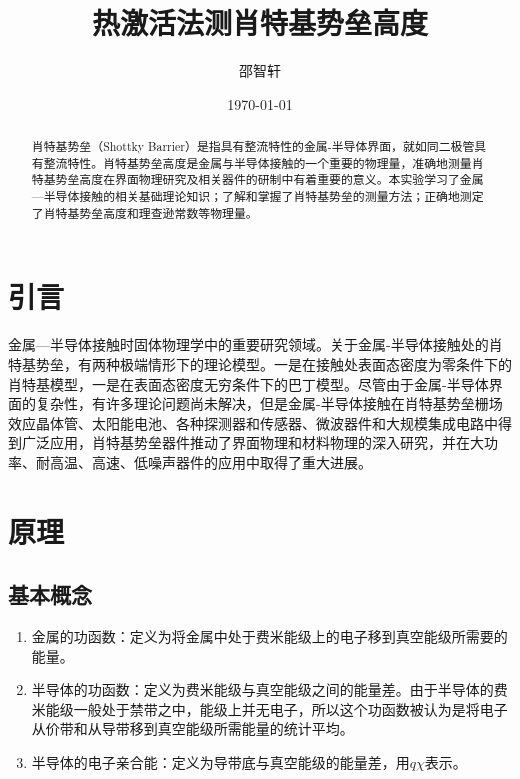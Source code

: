 \documentclass[aps,pre,12pt,preprint,onecolumn,showpacs,showkeys]{revtex4-1}
\begin{document}
\title{\bf\heiti{}热激活法测肖特基势垒高度\vspace{15mm}}
\author{\fangsong{}邵智轩\vspace{2mm}}
\date{\today}

\begin{abstract}
\vspace{10mm}
\begin{spacing}{1.5}
\songti{}
    肖特基势垒（Shottky Barrier）是指具有整流特性的金属-半导体界面，就如同二极管具有整流特性。肖特基势垒高度是金属与半导体接触的一个重要的物理量，准确地测量肖特基势垒高度在界面物理研究及相关器件的研制中有着重要的意义。本实验学习了金属—半导体接触的相关基础理论知识；了解和掌握了肖特基势垒的测量方法；正确地测定了肖特基势垒高度和理查逊常数等物理量。
\end{spacing}
\end{abstract}
\maketitle
\songti{}

\section{引言}
    金属—半导体接触时固体物理学中的重要研究领域。关于金属-半导体接触处的肖特基势垒，有两种极端情形下的理论模型。一是在接触处表面态密度为零条件下的肖特基模型，一是在表面态密度无穷条件下的巴丁模型。尽管由于金属-半导体界面的复杂性，有许多理论问题尚未解决，但是金属-半导体接触在肖特基势垒栅场效应晶体管、太阳能电池、各种探测器和传感器、微波器件和大规模集成电路中得到广泛应用，肖特基势垒器件推动了界面物理和材料物理的深入研究，并在大功率、耐高温、高速、低噪声器件的应用中取得了重大进展。

\section{原理}
    \subsection{基本概念}
        \begin{enumerate}
            \item 金属的功函数：定义为将金属中处于费米能级上的电子移到真空能级所需要的能量。
            \item 半导体的功函数：定义为费米能级与真空能级之间的能量差。由于半导体的费米能级一般处于禁带之中，能级上并无电子，所以这个功函数被认为是将电子从价带和从导带移到真空能级所需能量的统计平均。
            \item 半导体的电子亲合能：定义为导带底与真空能级的能量差，用$q\chi$表示。
        \end{enumerate}
\end{document}
